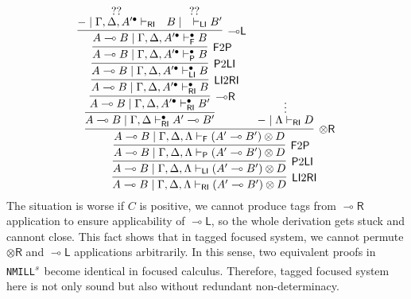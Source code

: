\documentclass[submission,copyright,creativecommons]{eptcs}
\theoremstyle{definition}
\newcommand{\tr}{\otimes \mathsf{R}}
\newcommand{\lright}{{\multimap}\mathsf{R}}
\newcommand{\lleft}{{\multimap}\mathsf{L}}
\newcommand{\ot}{\otimes}
\newcommand{\lolli}{\multimap}
\newcommand{\RI}{\mathsf{RI}}
\newcommand{\LI}{\mathsf{LI}}
\newcommand{\Pass}{\mathsf{P}}
\newcommand{\F}{\mathsf{F}}
\newcommand{\NMILL}{\texttt{NMILL}}
\newcommand{\SkNMILL}{\NMILL\textsuperscript{\textit{s}}}
\begin{document}
\begin{displaymath}
  \infer[\LI 2 \RI]{A \lolli B \mid \Gamma , \Delta , \Lambda \vdash_{\RI} (A' \lolli B') \ot D}{
    \infer[\Pass 2 \LI]{A \lolli B \mid \Gamma , \Delta , \Lambda \vdash_{\LI} (A' \lolli B') \ot D}{
      \infer[\F 2 \Pass]{A \lolli B \mid \Gamma , \Delta , \Lambda \vdash_{\Pass} (A' \lolli B') \ot D}{
        \infer[\tr]{A \lolli B \mid \Gamma , \Delta , \Lambda \vdash_{\F} (A' \lolli B') \ot D}{
          \infer{A \lolli B \mid \Gamma , \Delta \vdash^{\bullet}_{\RI} A' \lolli B'}{
            \infer[\lright]{A \lolli B \mid \Gamma , \Delta , A'^{\bullet} \vdash^{\bullet}_{\RI} B'}{
              \infer[\LI 2 \RI]{A \lolli B \mid \Gamma , \Delta , A'^{\bullet} \vdash^{\bullet}_{\RI} B}{
                \infer[\Pass 2 \LI]{A \lolli B \mid \Gamma , \Delta , A'^{\bullet} \vdash^{\bullet}_{\LI} B}{
                  \infer[\F 2 \Pass]{A \lolli B \mid \Gamma , \Delta , A'^{\bullet} \vdash^{\bullet}_{\Pass} B}{
                    \infer[\lleft]{A \lolli B \mid \Gamma , \Delta , A'^{\bullet} \vdash^{\bullet}_{\F} B}{
                      \deduce{- \mid \Gamma , \Delta , A'^{\bullet} \vdash_{\RI}}{??}
                      &
                      \deduce{B \mid \quad \vdash_{\LI} B'}{??}
                    }
                  }
                }
              }
            }
          }
          &
          \deduce{- \mid \Lambda \vdash_{\RI} D}{\vdots}
        }
      }
    }
  }
\end{displaymath}
The situation is worse if $C$ is positive, we cannot produce tags from $\lright$ application to ensure applicability of $\lleft$, so the whole derivation gets stuck and cannont close.
This fact shows that in tagged focused system, we cannot permute $\tr$ and $\lleft$ applications arbitrarily.
In this sense, two equivalent proofs in \SkNMILL\ become identical in focused calculus.
Therefore, tagged focused system here is not only sound but also without redundant non-determinacy.
\end{document}
